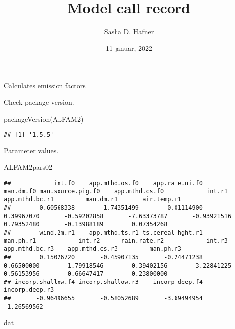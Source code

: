 \documentclass[
  landscape]{article}
\title{Model call record}
\author{Sasha D. Hafner}
\date{11 januar, 2022}
\newenvironment{Shaded}{\begin{snugshade}}{\end{snugshade}}
\newcommand{\FunctionTok}[1]{\textcolor[rgb]{0.00,0.00,0.00}{#1}}
\newcommand{\NormalTok}[1]{#1}
\newcommand{\StringTok}[1]{\textcolor[rgb]{0.31,0.60,0.02}{#1}}
\begin{document}
\maketitle

Calculates emission factors

Check package version.

\begin{Shaded}
\begin{Highlighting}[]
\FunctionTok{packageVersion}\NormalTok{(}\StringTok{\textquotesingle{}ALFAM2\textquotesingle{}}\NormalTok{)}
\end{Highlighting}
\end{Shaded}

\begin{verbatim}
## [1] '1.5.5'
\end{verbatim}

Parameter values.

\begin{Shaded}
\begin{Highlighting}[]
\NormalTok{ALFAM2pars02}
\end{Highlighting}
\end{Shaded}

\begin{verbatim}
##            int.f0    app.mthd.os.f0    app.rate.ni.f0         man.dm.f0 man.source.pig.f0    app.mthd.cs.f0            int.r1    app.mthd.bc.r1         man.dm.r1       air.temp.r1 
##       -0.60568338       -1.74351499       -0.01114900        0.39967070       -0.59202858       -7.63373787       -0.93921516        0.79352480       -0.13988189        0.07354268 
##        wind.2m.r1    app.mthd.ts.r1 ts.cereal.hght.r1         man.ph.r1            int.r2      rain.rate.r2            int.r3    app.mthd.bc.r3    app.mthd.cs.r3         man.ph.r3 
##        0.15026720       -0.45907135       -0.24471238        0.66500000       -1.79918546        0.39402156       -3.22841225        0.56153956       -0.66647417        0.23800000 
## incorp.shallow.f4 incorp.shallow.r3    incorp.deep.f4    incorp.deep.r3 
##       -0.96496655       -0.58052689       -3.69494954       -1.26569562
\end{verbatim}

\begin{Shaded}
\begin{Highlighting}[]
\NormalTok{dat}
\end{Highlighting}
\end{Shaded}
\end{document}
